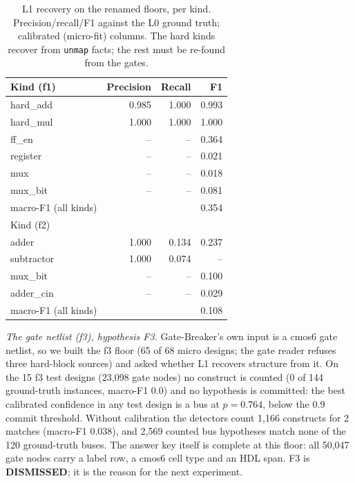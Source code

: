 \documentclass[conference]{IEEEtran}
\newcommand{\verdict}[1]{\textbf{\textsc{#1}}}
\newcommand{\code}[1]{\texttt{#1}}
\begin{document}
\begin{table}[t]
\caption{L1 recovery on the renamed floors, per kind. Precision/recall/F1 against the L0
ground truth; calibrated (micro-fit) columns. The hard kinds recover from \code{unmap}
facts; the rest must be re-found from the gates.}
\label{tab:l1}
\centering
\footnotesize
\begin{tabular}{@{}lrrr@{}}
\toprule
Kind (f1) & Precision & Recall & F1 \\
\midrule
hard\_add & 0.985 & 1.000 & 0.993 \\
hard\_mul & 1.000 & 1.000 & 1.000 \\
ff\_en & -- & -- & 0.364 \\
register & -- & -- & 0.021 \\
mux & -- & -- & 0.018 \\
mux\_bit & -- & -- & 0.081 \\
\midrule
macro-F1 (all kinds) & & & 0.354 \\
\midrule
Kind (f2) & & & \\
\midrule
adder & 1.000 & 0.134 & 0.237 \\
subtractor & 1.000 & 0.074 & -- \\
mux\_bit & -- & -- & 0.100 \\
adder\_cin & -- & -- & 0.029 \\
macro-F1 (all kinds) & & & 0.108 \\
\bottomrule
\end{tabular}
\end{table}

\emph{The gate netlist (f3), hypothesis F3.} Gate-Breaker's own input is a cmos6 gate netlist, so we built
the f3 floor (65 of 68 micro designs; the gate reader refuses three hard-block sources) and asked whether L1
recovers structure from it. %
On the 15 f3 test designs (23,098 gate nodes) no construct is counted (0 of 144 ground-truth
instances, macro-F1 0.0) and no hypothesis is committed: the best calibrated confidence in any test
design is a bus at $p=0.764$, below the 0.9 commit threshold. Without calibration the detectors count
1,166 constructs for 2 matches (macro-F1 0.038), and 2,569 counted bus hypotheses match none of the 120
ground-truth buses. The answer key itself is complete at this floor: all 50,047 gate nodes carry a label
row, a cmos6 cell type and an HDL span. F3 is \verdict{DISMISSED}; it is the reason for the next
experiment.
\end{document}
